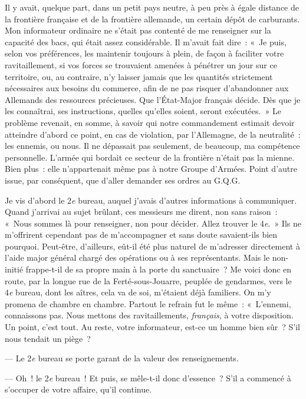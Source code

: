 \documentclass[french,twoside]{book} %
\begin{document}
Il y avait, quelque part, dans un petit pays neutre, à peu près à égale distance de la frontière française et de la frontière allemande, un certain dépôt de   carburants. Mon informateur ordinaire ne s’était pas contenté de me renseigner sur la capacité des bacs, qui était assez considérable. Il m’avait fait dire : « Je puis, selon vos préférences, les maintenir toujours à plein, de façon à faciliter votre ravitaillement, si vos forces se trouvaient amenées à pénétrer un jour sur ce territoire, ou, au contraire, n’y laisser jamais que les quantités strictement nécessaires aux besoins du commerce, afin de ne pas risquer d’abandonner aux Allemands des ressources précieuses. Que l’État-Major français décide. Dès que je les connaîtrai, ses instructions, quelles qu’elles soient, seront exécutées. » Le problème revenait, en somme, à savoir qui notre commandement estimait devoir atteindre d’abord ce point, en cas de violation, par l’Allemagne, de la neutralité : les ennemis, ou nous. Il ne dépassait pas seulement, de beaucoup, ma compétence personnelle. L’armée qui bordait ce secteur de la frontière n’était pas la mienne. Bien plus : elle n’appartenait même pas à notre Groupe d’Armées. Point d’autre issue, par conséquent, que d’aller demander ses ordres au G.Q.G.\par
Je vis d’abord le 2\emph{e} bureau, auquel j’avais d’autres informations à communiquer. Quand j’arrivai au sujet brûlant, ces messieurs me dirent, non sans raison : « Nous sommes là pour renseigner, non pour décider. Allez trouver le 4\emph{e}. » Ils ne m’offrirent cependant pas de m’accompagner et sans doute savaient-ils bien pourquoi. Peut-être, d’ailleurs, eût-il été plus naturel de m’adresser directement à l’aide major général chargé des opérations ou à ses représentants. Mais le non-initié frappe-t-il de sa propre main à la porte du sanctuaire ? Me voici donc en route, par la longue rue de la Ferté-sous-Jouarre, peuplée de gendarmes, vers le 4\emph{e} bureau, dont les aîtres, cela va de soi, m’étaient déjà familiers. On m’y promena de chambre en chambre. Partout le refrain fut le même : « L’ennemi, connaissons pas. Nous mettons des ravitaillements, \emph{français}, à votre   disposition. Un point, c’est tout. Au reste, votre informateur, est-ce un homme bien sûr ? S’il nous tendait un piège ?\par
— Le 2\emph{e} bureau se porte garant de la valeur des renseignements.\par
— Oh ! le 2\emph{e} bureau ! Et puis, se mêle-t-il donc d’essence ? S’il a commencé à s’occuper de votre affaire, qu’il continue.\par
\end{document}
